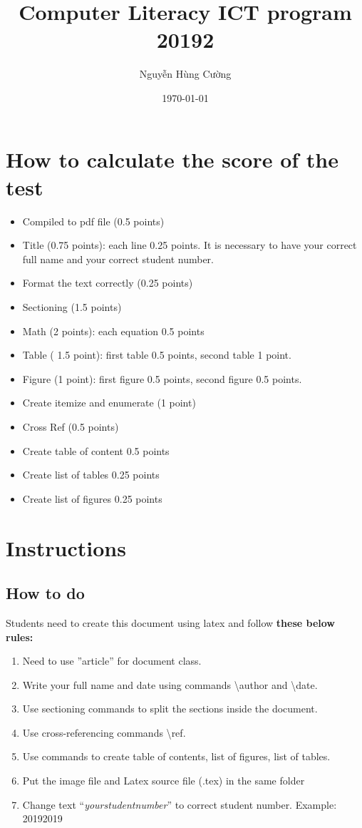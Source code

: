 \documentclass{article}
\title{\huge Computer Literacy ICT program 20192}
\author{\Large Nguyễn Hùng Cường}
\date{\Large \today}
\begin{document}
\maketitle

\section{How to calculate the score of the test}
\begin{itemize}
    \item Compiled to pdf file (0.5 points)
    \item Title (0.75 points): each line 0.25 points. It is necessary to have your correct full name and your correct student number.
    \item Format the text correctly (0.25 points)
    \item Sectioning (1.5 points)
    \item Math (2 points): each equation 0.5 points
    \item Table ( 1.5 point): first table 0.5 points, second table 1 point.
    \item Figure (1 point): first figure 0.5 points, second figure 0.5 points.
    \item Create itemize and enumerate (1 point)
    \item Cross Ref (0.5 points)
    \item Create table of content 0.5 points
    \item Create list of tables 0.25 points
    \item Create list of figures 0.25 points
\end{itemize}

\section{Instructions}
\subsection{How to do}
Students need to create this document using latex and follow \textbf{these below rules:}
\begin{enumerate}
    \item Need to use ''article'' for document class.
    \item Write your full name and date using commands \textbackslash \textsf{author} and \textbackslash \textsf{date}.
    \item Use sectioning commands to split the sections inside the document.
    \item Use cross-referencing commands \textbackslash \textsf{ref}.
    \item Use commands to create table of contents, list of figures, list of tables.
    \item Put the image file and Latex source file (.tex) in the same folder
    \item Change text ``\emph{your\textunderscore student\textunderscore number}'' to correct student number. Example: 20192019
\end{enumerate}
\end{document}
